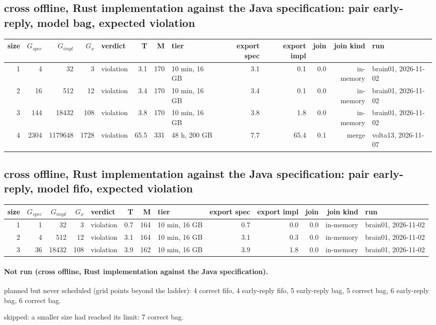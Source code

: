 \documentclass[10pt]{article}
\begin{document}
\subsection*{cross offline, Rust implementation against the Java specification: pair \textsf{early-reply}, model bag, expected violation}
\begin{longtable}{@{}rrrrlrrlrrrrl@{}}
\toprule
size & $G_{\mathit{spec}}$ & $G_{\mathit{impl}}$ & $G_x$ & verdict & T & M & tier & export spec & export impl & join & join kind & run \\
\midrule
\endhead
\color{red} 1 & 4 & 32 & 3 & violation & 3.1 & 170 & 10 min, 16 GB & 3.1 & 0.1 & 0.0 & in-memory & brain01, 2026-11-02 \\
\color{red} 2 & 16 & 512 & 12 & violation & 3.4 & 170 & 10 min, 16 GB & 3.4 & 0.1 & 0.0 & in-memory & brain01, 2026-11-02 \\
\color{red} 3 & 144 & 18432 & 108 & violation & 3.8 & 170 & 10 min, 16 GB & 3.8 & 1.8 & 0.0 & in-memory & brain01, 2026-11-02 \\
\color{red} 4 & 2304 & 1179648 & 1728 & violation & 65.5 & 331 & 48 h, 200 GB & 7.7 & 65.4 & 0.1 & merge & volta13, 2026-11-07 \\
\bottomrule
\end{longtable}
\subsection*{cross offline, Rust implementation against the Java specification: pair \textsf{early-reply}, model fifo, expected violation}
\begin{longtable}{@{}rrrrlrrlrrrrl@{}}
\toprule
size & $G_{\mathit{spec}}$ & $G_{\mathit{impl}}$ & $G_x$ & verdict & T & M & tier & export spec & export impl & join & join kind & run \\
\midrule
\endhead
\color{red} 1 & 1 & 32 & 3 & violation & 0.7 & 164 & 10 min, 16 GB & 0.7 & 0.0 & 0.0 & in-memory & brain01, 2026-11-02 \\
\color{red} 2 & 4 & 512 & 12 & violation & 3.1 & 164 & 10 min, 16 GB & 3.1 & 0.3 & 0.0 & in-memory & brain01, 2026-11-02 \\
\color{red} 3 & 36 & 18432 & 108 & violation & 3.9 & 162 & 10 min, 16 GB & 3.9 & 1.8 & 0.0 & in-memory & brain01, 2026-11-02 \\
\bottomrule
\end{longtable}
\paragraph{Not run (cross offline, Rust implementation against the Java specification).}
planned but never scheduled (grid points beyond the ladder): 4 correct fifo, 4 early-reply fifo, 5 early-reply bag, 5 correct bag, 6 early-reply bag, 6 correct bag.\par
skipped: a smaller size had reached its limit: 7 correct bag.\par
\end{document}
